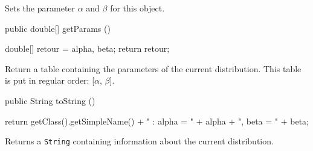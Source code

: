   \begin{tabb} Sets the parameter $\alpha$ and $\beta$ for this object.
  \end{tabb}
\begin{code}

   public double[] getParams ()\begin{hide} {
      double[] retour = {alpha, beta};
      return retour;
   }\end{hide}
\end{code}
\begin{tabb}
   Return a table containing the parameters of the current distribution.
   This table is put in regular order: [$\alpha$, $\beta$].
\end{tabb}
\begin{hide}\begin{code}

   public String toString ()\begin{hide} {
      return getClass().getSimpleName() + " : alpha = " + alpha + ", beta = " + beta;
   }\end{hide}
\end{code}
\begin{tabb}
   Returns a \texttt{String} containing information about the current distribution.
\end{tabb}\end{hide}
\begin{code}\begin{hide}
}\end{hide}
\end{code}
